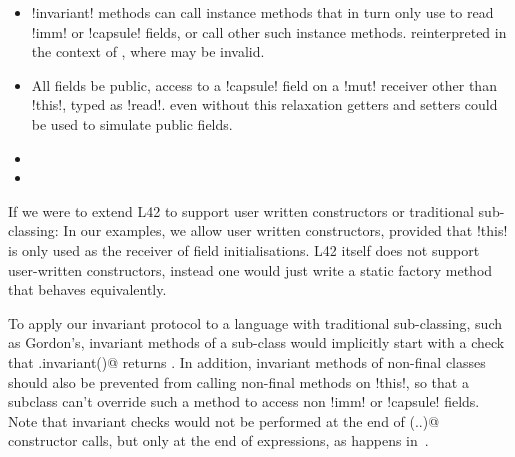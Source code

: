 \begin{itemize}
	\item \Q!invariant! methods can  call instance methods that in turn only use \Q@this@ to read \Q!imm! or \Q!capsule! fields, or call other such instance methods.
	 reinterpreted in the context of \Q@invariant@, where \Q@this@ may be invalid. 
	
	\item {} All fields   be public,  access to a \Q!capsule! field on a \Q!mut! receiver\IO{,} other than \Q!this!,  typed as \Q!read!.  even without this relaxation getters and setters could be used to simulate public fields.
	\item {}
	\item {}
\end{itemize}

If we were to extend L42 to support user written constructors or traditional sub-classing:
In our examples, we allow user written constructors, provided that \Q!this! is only used as the receiver of field initialisations. L42 itself does not support user-written constructors, instead one would just write a static factory method that behaves equivalently.

To apply our invariant protocol to a language with traditional sub-classing, such as Gordon\etal's, invariant methods of a sub-class would implicitly start with a check that \Q@super.invariant()@ returns \Q@true@. In addition, invariant methods of non-final classes should also be prevented from calling non-final methods on \Q!this!, so that a subclass can't override such a method to access non \Q!imm! or \Q!capsule! fields. Note that invariant checks would not be performed at the end of \Q@super(..)@ constructor calls, but only at the end of \Q@new@ expressions, as happens in~\cite{feldman2006jose}.

